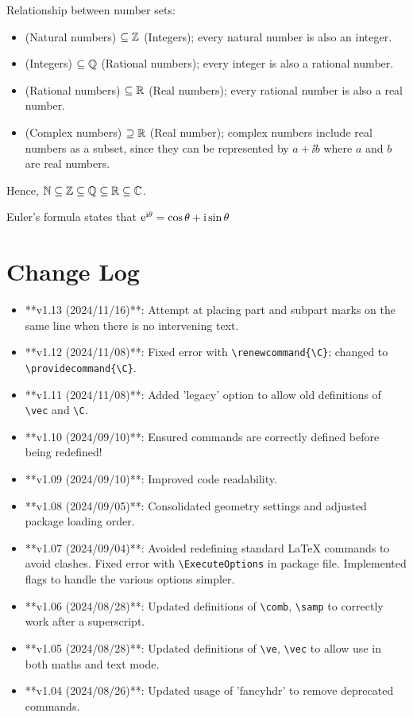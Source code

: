 \documentclass[twoside]{article}
\begin{document}
\begin{center}
    \begin{minipage}{0.7\textwidth}
        Relationship between number sets:
        \begin{itemize}
          \item \N{} (Natural numbers) $\subseteq \mathbb{Z}$ (Integers); every natural number is also an integer.
          \item \Z{} (Integers) $\subseteq \mathbb{Q}$ (Rational numbers); every integer is also a rational number.
          \item \Q{} (Rational numbers) $\subseteq \mathbb{R}$ (Real numbers); every rational number is also a real number.
          \item \Complex{} (Complex numbers) $\supseteq \mathbb{R}$ (Real number); complex numbers include real numbers as a subset, since they can be represented by $a+\ii b$ where $a$ and $b$ are real numbers.
        \end{itemize}
        Hence, $\mathbb{N}\subseteq\mathbb{Z}\subseteq\mathbb{Q}\subseteq\mathbb{R}\subseteq\mathbb{C}$.
        
        Euler's formula states that $\mathrm{e}^{\mathrm{i}\theta} = \cos\theta + \mathrm{i}\sin\theta$
    \end{minipage}
\end{center}
\section{Change Log}

\begin{itemize}
\item **v1.13 (2024/11/16)**: Attempt at placing part and subpart marks on the same line when there is no intervening text.
\item **v1.12 (2024/11/08)**: Fixed error with \verb|\renewcommand{\C}|; changed to \verb|\providecommand{\C}|.
\item **v1.11 (2024/11/08)**: Added 'legacy' option to allow old definitions of \verb|\vec| and \verb|\C|.
\item **v1.10 (2024/09/10)**: Ensured commands are correctly defined before being redefined!
\item **v1.09 (2024/09/10)**: Improved code readability.
\item **v1.08 (2024/09/05)**: Consolidated geometry settings and adjusted package loading order.
\item **v1.07 (2024/09/04)**: Avoided redefining standard LaTeX commands to avoid clashes. Fixed error with \verb|\ExecuteOptions| in package file. Implemented flags to handle the various options simpler.
\item **v1.06 (2024/08/28)**: Updated definitions of \verb|\comb|, \verb|\samp| to correctly work after a superscript.
\item **v1.05 (2024/08/28)**: Updated definitions of \verb|\ve|, \verb|\vec| to allow use in both maths and text mode.
\item **v1.04 (2024/08/26)**: Updated usage of 'fancyhdr' to remove deprecated commands.
\end{itemize}
\end{document}
